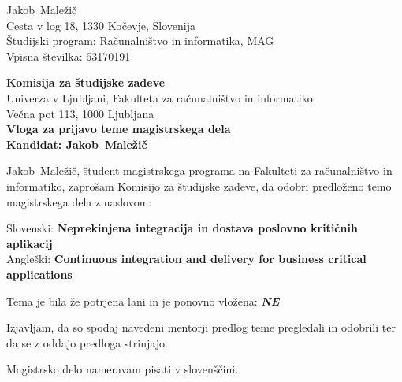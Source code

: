 \documentclass[a4paper, 12pt]{article}
\begin{document}
\newcommand{\ImeKandidata}{Jakob} %
\newcommand{\PriimekKandidata}{Maležič} %
\newcommand{\VpisnaStevilka}{63170191} %
\newcommand{\StudijskiProgram}{Računalništvo in informatika, MAG} %
\newcommand{\NaslovBivalisca}{ Cesta v log 18, 1330 Kočevje, Slovenija } %
\newcommand{\SLONaslov}{Neprekinjena integracija in dostava poslovno kritičnih aplikacij} %
\newcommand{\ENGNaslov}{Continuous integration and delivery for business critical applications} %


\newcommand{\Kandidat}{\ImeKandidata~\PriimekKandidata}
\noindent
\Kandidat\\
\NaslovBivalisca \\
Študijski program: \StudijskiProgram \\
Vpisna številka: \VpisnaStevilka
\bigskip

{\bf Komisija za študijske zadeve}\\
Univerza v Ljubljani, Fakulteta za računalništvo in informatiko\\
Večna pot 113, 1000 Ljubljana\\

{\Large\bf
{\centering
    Vloga za prijavo teme magistrskega dela \\%
\large Kandidat: \Kandidat \\[10mm]}}


\Kandidat, študent magistrskega programa na Fakulteti za računalništvo in informatiko, zaprošam Komisijo za študijske zadeve, da odobri predloženo temo magistrskega dela z naslovom:

Slovenski: {\bf \SLONaslov}\\
Angleški: {\bf \ENGNaslov}

Tema je bila že potrjena lani in je ponovno vložena: {\bf \textit{NE}}

Izjavljam, da so spodaj navedeni mentorji predlog teme pregledali in odobrili ter da se z oddajo predloga strinjajo.

Magistrsko delo nameravam pisati v slovenščini. %
\end{document}
